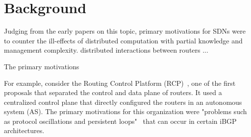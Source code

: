 \section{Background}
\label{sec:background}

Judging from the early papers on this topic, primary motivations for SDNs were to counter the ill-effects of distributed computation with partial knowledge and management complexity. distributed interactions between routers ...

The primary motivations 

For example, consider the Routing Control Platform (RCP)~\cite{rcp-case,rcp}, one of the first proposals that separated the control and data plane of routers. It used a centralized control plane that directly configured the routers in an autonomous system (AS). The primary motivations for this organization were "problems such as protocol oscillations and persistent loops"~\cite{rcp} that can occur in certain iBGP architectures.
